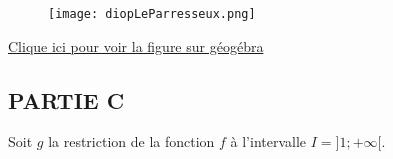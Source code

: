 \documentclass[12pt,a4paper]{article}
\begin{document}
\begin{enumerate}
\begin{center}
        \begin{figure}[H]%
         \centering
         \texttt{[image: diopLeParresseux.png]}
        \end{figure}
    \end{center}
        \href{https://www.geogebra.org/classic/efgm6ucx}{Clique ici pour voir la figure sur géogébra}

\end{enumerate}

\subsection*{PARTIE C}

Soit \( g \) la restriction de la fonction \( f \) à l’intervalle \( I = ]1 ; +\infty[ \).
\end{document}
